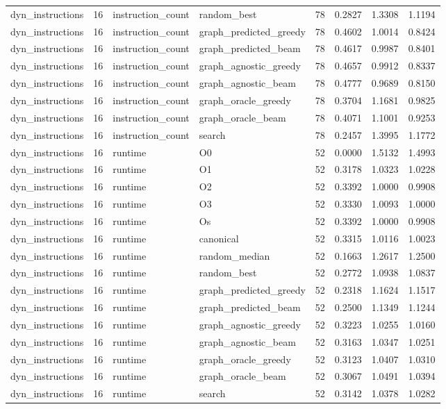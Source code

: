 \begin{table}[t]
\begin{tabular}{lrllrrrr}
dyn\_instructions & 16 & instruction\_count & random\_best & 78 & 0.2827 & 1.3308 & 1.1194 \\
dyn\_instructions & 16 & instruction\_count & graph\_predicted\_greedy & 78 & 0.4602 & 1.0014 & 0.8424 \\
dyn\_instructions & 16 & instruction\_count & graph\_predicted\_beam & 78 & 0.4617 & 0.9987 & 0.8401 \\
dyn\_instructions & 16 & instruction\_count & graph\_agnostic\_greedy & 78 & 0.4657 & 0.9912 & 0.8337 \\
dyn\_instructions & 16 & instruction\_count & graph\_agnostic\_beam & 78 & 0.4777 & 0.9689 & 0.8150 \\
dyn\_instructions & 16 & instruction\_count & graph\_oracle\_greedy & 78 & 0.3704 & 1.1681 & 0.9825 \\
dyn\_instructions & 16 & instruction\_count & graph\_oracle\_beam & 78 & 0.4071 & 1.1001 & 0.9253 \\
dyn\_instructions & 16 & instruction\_count & search & 78 & 0.2457 & 1.3995 & 1.1772 \\
dyn\_instructions & 16 & runtime & O0 & 52 & 0.0000 & 1.5132 & 1.4993 \\
dyn\_instructions & 16 & runtime & O1 & 52 & 0.3178 & 1.0323 & 1.0228 \\
dyn\_instructions & 16 & runtime & O2 & 52 & 0.3392 & 1.0000 & 0.9908 \\
dyn\_instructions & 16 & runtime & O3 & 52 & 0.3330 & 1.0093 & 1.0000 \\
dyn\_instructions & 16 & runtime & Os & 52 & 0.3392 & 1.0000 & 0.9908 \\
dyn\_instructions & 16 & runtime & canonical & 52 & 0.3315 & 1.0116 & 1.0023 \\
dyn\_instructions & 16 & runtime & random\_median & 52 & 0.1663 & 1.2617 & 1.2500 \\
dyn\_instructions & 16 & runtime & random\_best & 52 & 0.2772 & 1.0938 & 1.0837 \\
dyn\_instructions & 16 & runtime & graph\_predicted\_greedy & 52 & 0.2318 & 1.1624 & 1.1517 \\
dyn\_instructions & 16 & runtime & graph\_predicted\_beam & 52 & 0.2500 & 1.1349 & 1.1244 \\
dyn\_instructions & 16 & runtime & graph\_agnostic\_greedy & 52 & 0.3223 & 1.0255 & 1.0160 \\
dyn\_instructions & 16 & runtime & graph\_agnostic\_beam & 52 & 0.3163 & 1.0347 & 1.0251 \\
dyn\_instructions & 16 & runtime & graph\_oracle\_greedy & 52 & 0.3123 & 1.0407 & 1.0310 \\
dyn\_instructions & 16 & runtime & graph\_oracle\_beam & 52 & 0.3067 & 1.0491 & 1.0394 \\
dyn\_instructions & 16 & runtime & search & 52 & 0.3142 & 1.0378 & 1.0282 \\
\bottomrule
\end{tabular}
\end{table}
